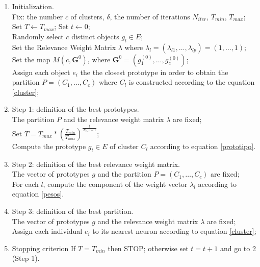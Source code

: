 \documentclass[10pt, conference, compsocconf]{IEEEtran}
\begin{document}
\begin{enumerate}
\item Initialization.\\
Fix: the number $c$ of clusters, $\delta$, the number of iterations $N_{iter}$, $T_{min}$, $T_{max}$; Set $T \leftarrow T_{max}$; Set $t \leftarrow 0$;\\
Randomly select $c$ distinct objects $g_l \in E$;\\
Set the Relevance Weight Matrix $\lambda$ where $\lambda_l = (\lambda_{l1}, \dots, \lambda_{lp}) = (1, \dots, 1)$;\\
Set the map $M(c,\textbf{G}^0)$, where $\textbf{G}^0 = (g_1^{(0)},\dots,g_c^{(0)})$;\\
Assign each object $e_i$ the the closest prototype in order to obtain the partition $P = (C_1,\dots, C_c)$ where $C_l$ is constructed according to the equation \ref{cluster};\\

\item Step 1: definition of the best prototypes.\\
The partition $P$ and the relevance weight matrix $\lambda$ are fixed;\\
Set $T = T_{max}\ast (\frac{T_{min}}{T_{max}})^\frac{t}{N_{iter}-1}$;\\
Compute the prototype $g_l \in E$ of cluster $C_l$ according to equation \ref{prototipo}.\\

\item Step 2: definition of the best relevance weight matrix.\\
The vector of prototypes $g$ and the partition $P = (C_1,\dots, C_c)$ are fixed;\\
For each $l$, compute the component of the weight vector $\lambda_l$ according to equation \ref{pesos}.\\

\item Step 3: definition of the best partition.\\
The vector of prototypes $g$ and the relevance weight matrix $\lambda$ are fixed;\\
Assign each individual $e_i$ to its nearest neuron according to equation \ref{cluster};\\

%

\item Stopping criterion
If $T = T_{min}$ then STOP; otherwise set $t = t+1$ and go to 2 (Step 1).

\end{enumerate}
\end{document}
